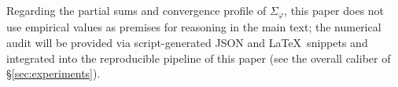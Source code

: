 \begin{remark}\label{rem:fold-sigma-phi-audit-pointer}
Regarding the partial sums and convergence profile of \(\Sigma_\varphi\), this paper does not use empirical values as premises for reasoning in the main text;
the numerical audit will be provided via script-generated JSON and \LaTeX\ snippets and integrated into the reproducible pipeline of this paper (see the overall caliber of \S\ref{sec:experiments}).
\end{remark}
